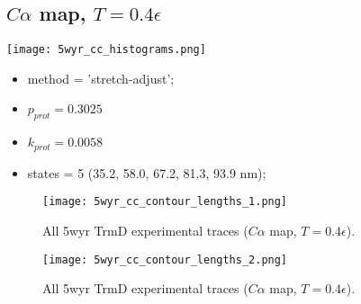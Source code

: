 \subsection{$C\alpha$ map, $T=0.4\epsilon$}
\label{subsec:5wyr-cc}
\begin{minipage}[c]{0.7\textwidth}
    \texttt{[image: 5wyr\_cc\_histograms.png]}
\end{minipage}
\hfill
\begin{minipage}[c]{0.45\textwidth}
    \begin{itemize}
        \item method = 'stretch-adjust';
        \item $p_{prot}=0.3025$
        \item $k_{prot}=0.0058$
        \item states = 5 (35.2, 58.0, 67.2, 81.3, 93.9 nm);
    \end{itemize}
\end{minipage}

\begin{figure}
    \centering
    \texttt{[image: 5wyr\_cc\_contour\_lengths\_1.png]}
    \caption{All 5wyr TrmD experimental traces ($C\alpha$ map, $T=0.4\epsilon$).}
    \label{fig:5wyr-cc-cl1}
\end{figure}

\begin{figure}
    \centering
    \texttt{[image: 5wyr\_cc\_contour\_lengths\_2.png]}
    \caption{All 5wyr TrmD experimental traces ($C\alpha$ map, $T=0.4\epsilon$).}
    \label{fig:5wyr-cc-cl2}
\end{figure}

